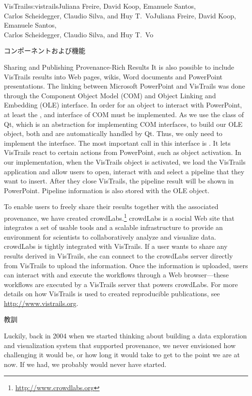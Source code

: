 \begin{aosachaptertoc}{VisTrails}{s:vistrails}{Juliana Freire, David Koop, Emanuele Santos, \\ Carlos Scheidegger, Claudio Silva, and Huy T.\ Vo}{Juliana Freire, David Koop, Emanuele Santos, \\ \hspace*{0.9cm} Carlos Scheidegger, Claudio Silva, and Huy T.\ Vo}
\begin{aosasect1}{コンポーネントおよび機能}
\begin{aosasect2}{Sharing and Publishing Provenance-Rich Results}
It is also possible to include VisTrails results into Web pages,
wikis, Word documents and PowerPoint presentations. The linking
between Microsoft PowerPoint and VisTrails was done through the
Component Object Model (COM) and Object Linking and Embedding (OLE)
interface. In order for an object to interact with PowerPoint, at
least the ,  and
 interface of COM must be implemented. As we use
the  class of Qt, which is an abstraction for
implementing COM interfaces, to build our OLE object, both
 and  are automatically
handled by Qt. Thus, we only need to implement the 
interface. The most important call in this interface is
. It lets VisTrails react to certain actions from
PowerPoint, such as object activation. In our implementation, when the
VisTrails object is activated, we load the VisTrails application and
allow users to open, interact with and select a pipeline that they
want to insert. After they close VisTrails, the pipeline result will
be shown in PowerPoint. Pipeline information is also stored with the
OLE object.

To enable users to freely share their results together with the
associated provenance, we have created
crowdLabs.\footnote{\url{http://www.crowdlabs.org}} crowdLabs is a
social Web site that integrates a set of usable tools and a scalable
infrastructure to provide an environment for scientists to
collaboratively analyze and visualize data.  crowdLabs is tightly
integrated with VisTrails. If a user wants to share any results
derived in VisTrails, she can connect to the crowdLabs server directly
from VisTrails to upload the information. Once the information is
uploaded, users can interact with and execute the workflows through a
Web browser---these workflows are executed by a VisTrails server that
powers crowdLabs. For more details on how VisTrails is used to created reproducible publications, see \url{http://www.vistrails.org}.

\end{aosasect2}

\end{aosasect1}

\begin{aosasect1}{教訓}

Luckily, back in 2004 when we started thinking about building a data
exploration and visualization system that supported provenance, we
never envisioned how challenging it would be, or how long it would
take to get to the point we are at now. If we had, we probably would
never have started.


\end{aosasect1}
\end{aosachaptertoc}
